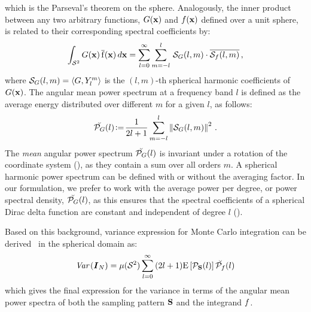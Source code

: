 which is the Parseval's theorem on the sphere. Analogously,
the inner product between any two arbitrary functions, ${G}(\mathbf{x})$ and
${f}(\mathbf{x})$ defined over a unit sphere, is related to their corresponding spectral coefficients by:
%
\begin{equation}
\int_{{\mathcal{S}^{2}}} {G}(\mathbf{x}) \, \mathrm{\overline{{f}}}(\mathbf{x}) \, d\mathbf{x} =
\sum_{l=0}^{\infty} \sum_{m=-l}^{l}\, \mathcal{S}_{{G}}(l,m)\cdot\overline{\mathcal{S}_{{f}}(l,m)}\,,
\end{equation}
%
where $\mathcal{S}_{{G}}(l,m)=\langle{G},Y_l^m\rangle$ is the $(l,m)$-th spherical harmonic coefficients of ${G}(\mathbf{x})$. The angular mean power spectrum at a frequency band $l$ is defined as the average energy distributed over different $m$ for a given $l$, as follows:
%
\begin{equation}
\breve{\mathcal{P}_{{G}}}(l) \!\mathrel{\mathop:}=\! \frac{1}{2l+1} \sum_{m=-l}^{l} \left\|\mathcal{S}_{{G}}(l,m)\right\|^2\,.
\end{equation}
%
The \emph{mean} angular power spectrum $\breve{\mathcal{P}_{{G}}}(l)$ is invariant 
under a rotation of the coordinate system (\cite{Kaula1967,lowes1974spatial}), as they contain a sum over all orders $m$. 
A spherical harmonic power spectrum can be defined with or without the averaging factor. In our formulation, 
we prefer to work with the average power per degree, or power spectral density, $\breve{\mathcal{P}_{{G}}}(l)$, as 
this ensures that the spectral coefficients of a spherical Dirac delta function are constant and independent of degree $l$  (\cite{hipkin2001statistics}). 

%
Based on this background, variance expression for Monte Carlo integration can be derived~\cite{Pilleboue:2015:VAM} in the spherical domain as:
%
\begin{align}
\label{eq:sphere_var_finale}
\textit{Var}\left({\boldsymbol{I}_N}\right) = {\mu({\mathcal{S}^{2}})} \sum_{l=0}^{\infty}\, (2l+1) \mathrm{E} \left[\mathcal{P}_{\textbf{S}}(l) \right] \breve{\mathcal{P}_{{f}}}(l)
\end{align}
%
which gives the final expression for the variance in terms of the angular mean power spectra of both the sampling pattern 
$\textbf{S}$ and the integrand ${f}$. 
